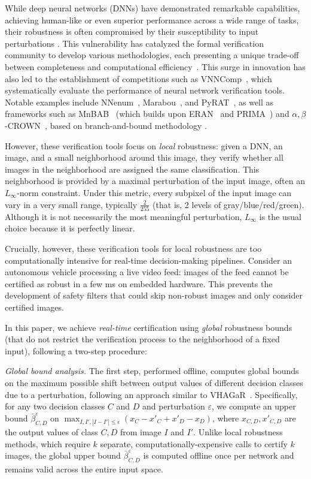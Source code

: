 While deep neural networks (DNNs) have demonstrated remarkable capabilities, achieving human-like or even superior performance across a wide range of tasks, their robustness is often compromised by their susceptibility to input perturbations \cite{szegedy}. This vulnerability has catalyzed the formal verification community to develop various methodologies, each presenting a unique trade-off between completeness and computational efficiency~\cite{Marabou,Reluplex,deeppoly}. 
This surge in innovation has also led to the establishment of competitions such as VNNComp~\cite{VNNcomp}, which systematically evaluate the performance of neural network verification tools. Notable examples include NNenum~\cite{nnenum}, Marabou~\cite{Marabou,Marabou2}, and PyRAT~\cite{pyrat}, as well as frameworks such as MnBAB~\cite{ferrari2022complete} (which builds upon ERAN~\cite{deeppoly} and PRIMA~\cite{prima}) and $\alpha,\beta$-CROWN~\cite{crown,xu2020fast}, based on branch-and-bound methodology \cite{BaB}.

However, these verification tools focus on {\em local} robustness: given a DNN, an image, and a small neighborhood around this image, they verify whether all images in the neighborhood are assigned the same classification. This neighborhood is provided by a maximal perturbation of the input image, often an $L_\infty$-norm constraint. Under this metric, every subpixel of the input image can vary in a very small range, typically $\frac{2}{255}$ (that is, 2 levels of gray/blue/red/green). 
Although it is not necessarily the most meaningful perturbation, $L_\infty$ is the usual choice because it is perfectly linear. 

Crucially, however, these verification tools for local robustness are too computationally intensive for real-time decision-making pipelines. 
Consider an autonomous vehicle processing a live video feed: images of the feed cannot be certified as robust in a few ms on embedded hardware. This prevents the development of safety filters that could skip non-robust images and only consider certified images.

\smallskip

In this paper, we achieve {\em real-time} certification 
using {\em global} robustness bounds (that do not restrict the verification process to the neighborhood of a fixed input), following a two-step procedure:

 
\textit{Global bound analysis.} The first step, performed offline, computes global bounds on the maximum possible shift between output values of different decision classes due to a perturbation, following an approach similar to VHAGaR~\cite{vhagar}. 
%
Specifically, for any two decision classes $C$ and $D$ and perturbation $\varepsilon$, we compute an 
upper bound 
$\bar{\beta}^\varepsilon_{C,D}$ 
on $\max_{I,I', |I-I'| \leq \epsilon}(
x_C - x'_C + x'_D - x_D)$, where $x_{C,D},x'_{C,D}$ are the output values of class $C,D$ from image $I$ and $I'$. 
%
Unlike local robustness methods, which require $k$ separate, computationally-expensive calls to certify $k$ images, the global upper bound $\bar{\beta}^\varepsilon_{C,D}$ is computed offline once per network and remains valid across the entire input space. 

